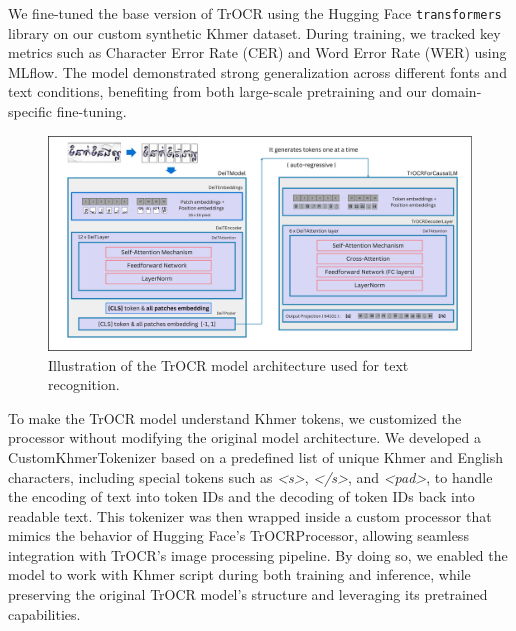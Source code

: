 We fine-tuned the base version of TrOCR using the Hugging Face \texttt{transformers} library on our custom synthetic Khmer dataset. During training, we tracked key metrics such as Character Error Rate (CER) and Word Error Rate (WER) using MLflow. The model demonstrated strong generalization across different fonts and text conditions, benefiting from both large-scale pretraining and our domain-specific fine-tuning.

\begin{figure}[H]
    \centering
    \includegraphics[width=\textwidth]{figures/trocr_model.png}
    \caption{Illustration of the TrOCR model architecture used for text recognition.}
    \label{fig:trocr-model}
\end{figure}


To make the TrOCR model understand Khmer tokens, 
we customized the processor without modifying the original 
model architecture. We developed a CustomKhmerTokenizer 
based on a predefined list of unique Khmer and English characters, 
including special tokens such as \textit{<s>}, \textit{</s>}, and 
\textit{<pad>}, to handle 
the encoding of text into token IDs and the decoding of token IDs 
back into readable text. This tokenizer was then wrapped inside 
a custom processor that mimics the behavior of Hugging Face’s 
TrOCRProcessor, allowing seamless integration with TrOCR’s image 
processing pipeline. By doing so, we enabled the model to work 
with Khmer script during both training and inference, while 
preserving the original TrOCR model’s structure and leveraging 
its pretrained capabilities.


